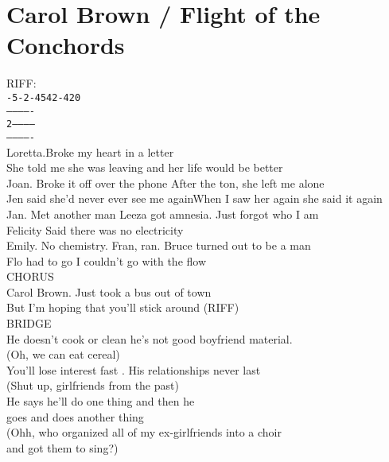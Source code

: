 \section{Carol Brown / Flight of the Conchords}\label{sec:carolbrown}

\DmajorEasy
\Amajor
\FsharpMinor
\Bminor
\Eminor

RIFF:\\
\texttt{-5-2-4542-420}\\
\texttt{-------------}\\
\texttt{2------------}\\
\texttt{-------------}\\

Loretta.Broke my heart in a letter\\
She told me she was leaving and her life would be better\\
Joan. Broke it off over the phone  After the ton, she left me alone\\
Jen said she'd never ever see me againWhen I saw her again she said it again\\
Jan. Met another man Leeza got amnesia. Just forgot who I am\\
Felicity Said there was no electricity\\
Emily. No chemistry. Fran, ran. Bruce turned out to be a man\\
Flo had to go I couldn't go with the flow\\
CHORUS\\
Carol Brown. Just took a bus out of town\\
But I'm hoping that you'll stick around (RIFF)\\
BRIDGE\\
He doesn't cook or clean he's not good boyfriend material.\\
 (Oh, we can eat cereal)\\
You'll lose interest fast . His relationships never last\\
 (Shut up, girlfriends from the past)\\
He says he'll do one thing and then he\\
 goes and does another thing\\
(Ohh, who organized all of my ex-girlfriends into a choir\\
and got them to sing?)\\
